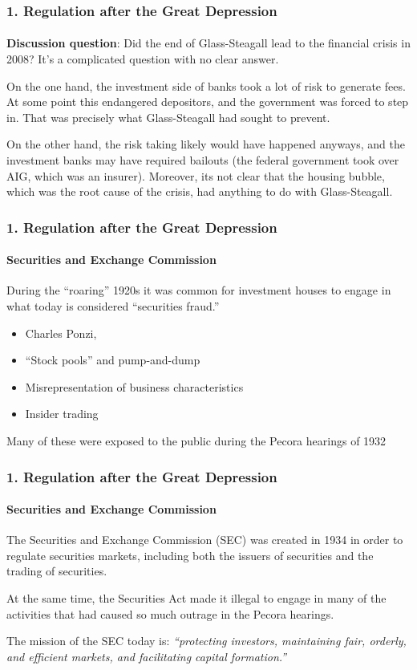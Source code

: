 \documentclass{beamer}
\begin{document}
\begin{frame}[t]
\frametitle{1. Regulation after the Great Depression}
\framesubtitle{}

    \textbf{Discussion question}: Did the end of Glass-Steagall lead to the financial crisis in 2008?   It's a complicated question with no clear answer.
    \vspace{1em}
    
    On the one hand, the investment side of banks took a lot of risk to generate fees.   At some point this endangered depositors, and the government was forced to step in.   That was precisely what Glass-Steagall had sought to prevent.
    \vspace{1em}
    
    On the other hand, the risk taking likely would have happened anyways, and the investment banks may have required bailouts (the federal government took over AIG, which was an insurer).   Moreover, its not clear that the housing bubble, which was the root cause of the crisis, had anything to do with Glass-Steagall.


\end{frame}


\begin{frame}[t]
\frametitle{1. Regulation after the Great Depression}
\framesubtitle{Securities and Exchange Commission}

    During the “roaring” 1920s it was common for investment houses to engage in what today is considered “securities fraud.”   
     \vspace{1em}
    \begin{itemize}
        \item Charles Ponzi,
        \item “Stock pools”  and pump-and-dump
        \item Misrepresentation of business characteristics
        \item Insider trading
    \end{itemize}
    \vspace{1em}
    
    Many of these were exposed to the public during the Pecora hearings of 1932

\end{frame}

\begin{frame}[t]
\frametitle{1. Regulation after the Great Depression}
\framesubtitle{Securities and Exchange Commission}

The Securities and Exchange Commission (SEC) was created in 1934 in order to regulate securities markets, including both the issuers of securities and the trading of securities.   
\vspace{1em}

At the same time, the Securities Act made it illegal to engage in many of the activities that had caused so much outrage in the Pecora hearings.
\vspace{1em}

The mission of the SEC today is: \textit{“protecting investors, maintaining fair, orderly, and efficient markets, and facilitating capital formation.”}


\end{frame}
\end{document}

